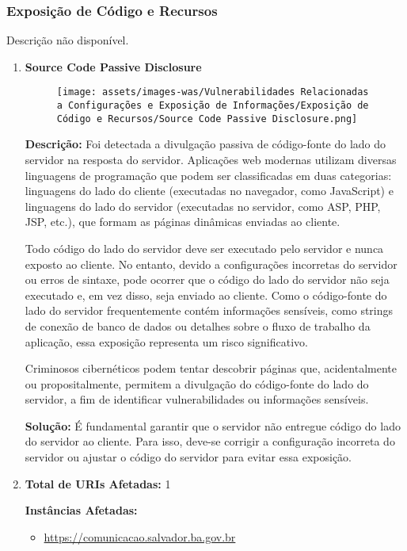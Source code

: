 \documentclass[a4paper,12pt]{article}
\begin{document}
\subsubsection{Exposição de Código e Recursos}
Descrição não disponível.

\begin{enumerate}
\item \textbf{Source Code Passive Disclosure}

                        \begin{figure}[h!]
                        \centering
                        \texttt{[image: assets/images-was/Vulnerabilidades Relacionadas a Configurações e Exposição de Informações/Exposição de Código e Recursos/Source Code Passive Disclosure.png]}
                        \end{figure}
                        \FloatBarrier
                        \textbf{Descrição:} Foi detectada a divulgação passiva de código-fonte do lado do servidor na resposta do servidor. Aplicações web modernas utilizam diversas linguagens de programação que podem ser classificadas em duas categorias: linguagens do lado do cliente (executadas no navegador, como JavaScript) e linguagens do lado do servidor (executadas no servidor, como ASP, PHP, JSP, etc.), que formam as páginas dinâmicas enviadas ao cliente.

    Todo código do lado do servidor deve ser executado pelo servidor e nunca exposto ao cliente. No entanto, devido a configurações incorretas do servidor ou erros de sintaxe, pode ocorrer que o código do lado do servidor não seja executado e, em vez disso, seja enviado ao cliente. Como o código-fonte do lado do servidor frequentemente contém informações sensíveis, como strings de conexão de banco de dados ou detalhes sobre o fluxo de trabalho da aplicação, essa exposição representa um risco significativo.

    Criminosos cibernéticos podem tentar descobrir páginas que, acidentalmente ou propositalmente, permitem a divulgação do código-fonte do lado do servidor, a fim de identificar vulnerabilidades ou informações sensíveis.

\textbf{Solução:} É fundamental garantir que o servidor não entregue código do lado do servidor ao cliente. Para isso, deve-se corrigir a configuração incorreta do servidor ou ajustar o código do servidor para evitar essa exposição.

    \item

\textbf{Total de URIs Afetadas:} 1

\textbf{Instâncias Afetadas:}
\begin{itemize}
    \item \url{https://comunicacao.salvador.ba.gov.br}
\end{itemize}

\end{enumerate}
\end{document}

